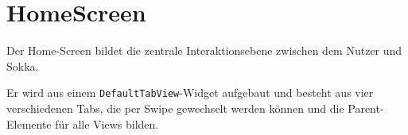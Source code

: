 \section{HomeScreen}

Der Home-Screen bildet die zentrale Interaktionsebene zwischen dem Nutzer und Sokka.

Er wird aus einem \lstinline{DefaultTabView}-Widget aufgebaut und besteht aus vier
verschiedenen Tabs, die per Swipe gewechselt werden können und die Parent-Elemente
für alle Views bilden.

